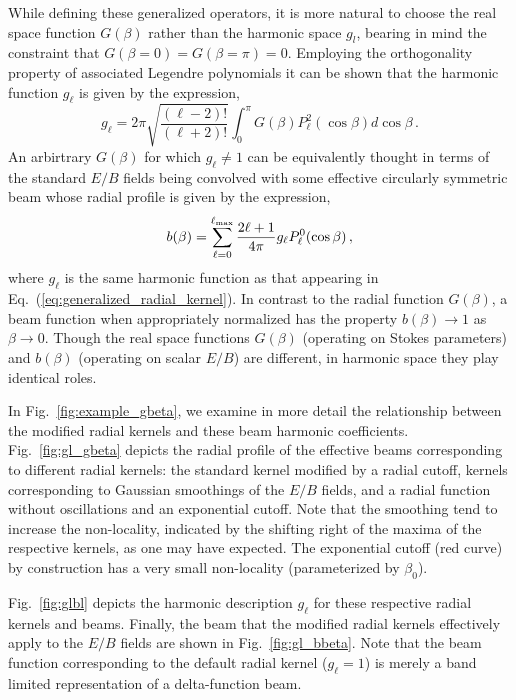 \documentclass[a4paper,11pt]{article}
\newcommand{\beq}{\begin{equation}}
\newcommand{\eeq}{\end{equation}}
\def\eq#1{{Eq.~(\ref{#1})}}
\def\fig#1{{Fig.~\ref{#1}}}
\begin{document}
While defining these generalized operators, it is more natural to choose the real space function $G(\beta)$ rather than the harmonic space $g_l$, bearing in mind the constraint that $G(\beta=0)=G(\beta=\pi)=0$. Employing the orthogonality property of associated Legendre polynomials it can be shown that the harmonic function $g_{\ell}$ is given by the expression,
%
\beq
g_{\ell} = 2 \pi \sqrt{\frac{(\ell-2)!}{(\ell+2)!}} \int _{0}^{\pi} G(\beta) P_{\ell}^{2}(\cos{\beta}) d\cos{\beta} \,. \label{eq:gb2bl}
\eeq
%
An arbirtrary $G(\beta)$ for which $g_{\ell} \neq 1$ can be equivalently thought in terms of the standard $E/B$ fields being convolved with some effective circularly symmetric beam whose radial profile is given by the expression,
%
\beq
b(\beta) = \sum_{\ell=0}^{\ell_{\rm max}} \frac{2 \ell+1}{4 \pi} g_{\ell} P_{\ell}^{0} (\cos{\beta})\,,
\eeq
%
where $g_{\ell}$ is the same harmonic function as that appearing in \eq{eq:generalized_radial_kernel}.
In contrast to the radial function $G(\beta)$, a beam function when appropriately normalized has the property $b(\beta) \rightarrow 1$ as $\beta \rightarrow 0$. Though the real space functions $G(\beta)$ (operating on Stokes parameters) and $b(\beta)$ (operating on scalar $E/B$) are different, in harmonic space they play identical roles.

In \fig{fig:example_gbeta}, we examine in more detail the relationship between the modified radial kernels and these beam harmonic coefficients.  
 \fig{fig:gl_gbeta} depicts the radial profile of the  effective beams corresponding to different radial kernels: the standard kernel modified by a radial cutoff, kernels corresponding to Gaussian smoothings of the $E/B$ fields, and a radial function without oscillations and an exponential cutoff.  Note that the smoothing tend to increase the non-locality, indicated by the shifting right of the maxima of the respective kernels, as one may have expected.  The exponential cutoff (red curve) by construction has a very small non-locality (parameterized by $\beta_0$).

\fig{fig:glbl} depicts the harmonic description $g_{\ell}$ for these respective radial kernels and beams.
Finally, the beam that the modified radial kernels effectively apply to the $E/B$ fields are shown in \fig{fig:gl_bbeta}.  Note that the beam function corresponding to the default radial kernel ($g_{\ell}=1$) is merely a band limited representation of a delta-function beam.
\end{document}
